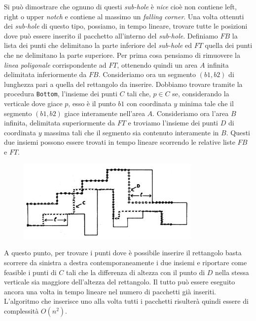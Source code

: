 Si può dimostrare che ognuno di questi \emph{sub-hole} è \emph{nice} cioè non contiene left, right o upper \emph{notch} e contiene al massimo un \emph{falling corner}. Una volta ottenuti dei \emph{sub-hole} di questo tipo, possiamo, in tempo lineare, trovare tutte le posizioni dove può essere inserito il pacchetto all'interno del \emph{sub-hole}.
Definiamo $FB$ la lista dei punti che delimitano la parte inferiore del \emph{sub-hole} ed $FT$ quella dei punti che ne delimitano la parte superiore. 
Per prima cosa pensiamo di rimuovere la \emph{linea poligonale} corrispondente ad $FT$, ottenendo quindi un area $A$ infinita delimitata inferiormente da $FB$. Consideriamo ora un segmento $(b1,b2)$ di lunghezza pari a quella del rettangolo da inserire. Dobbiamo trovare tramite la procedura \texttt{Bottom}, l'insieme dei punti $C$ tali che, $p \in C$ se, considerando la verticale dove giace $p$, esso è il punto $b1$ con coordinata $y$ minima tale che il segmento $(b1,b2)$ giace interamente nell'area $A$.
Consideriamo ora l'area $B$ infinita, delimitata superiormente da $FT$ e troviamo l'insieme dei punti $D$ di coordinata $y$ massima tali che il segmento sia contenuto interamente in $B$. Questi due insiemi possono essere trovati in tempo lineare scorrendo le relative liste $FB$ e $FT$.

\begin{figure}[h!tp]
 \centering
 \includegraphics[width=0.8\textwidth]{./img/imgBLF2.pdf}
 \caption{}
 \label{fig:imgBLF2}
\end{figure}

A questo punto, per trovare i punti dove è possibile inserire il rettangolo basta scorrere da sinistra a destra contemporaneamente i due insiemi e riportare come feasible i punti di $C$ tali che la differenza di altezza con il punto di $D$ nella stessa verticale sia maggiore dell'altezza del rettangolo. Il tutto può essere eseguito ancora una volta in tempo lineare nel numero di pacchetti già inseriti. L'algoritmo che inserisce uno alla volta tutti i pacchetti risulterà quindi essere di complessità $O(n^2)$.
